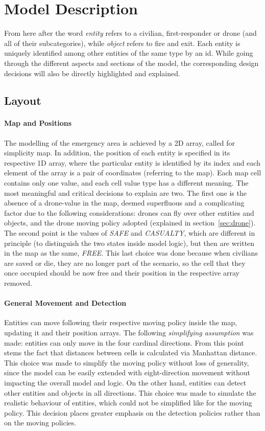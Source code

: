 
\section{Model Description}
From here after the word \textit{entity} refers to a civilian, first-responder or drone (and all of their subcategories), while \textit{object} refers to fire and exit. Each entity is uniquely identified among other entities of the same type by an id. While going through the different aspects and sections of the model, the corresponding design decisions will also be directly highlighted and explained.


\subsection{Layout}
\paragraph{Map and Positions}
\label{sec:map}
The modelling of the emergency area is achieved by a 2D array, called for simplicity map. In addition, the position of each entity is specified in its respective 1D array, where the particular entity is identified by its index and each element of the array is a pair of coordinates (referring to the map).\newline
Each map cell contains only one value, and each cell value type has a different meaning. The most meaningful and critical decisions to explain are two. The first one is the absence of a drone-value in the map, deemed superfluous and a complicating factor due to the following considerations: drones can fly over other entities and objects, and the drone moving policy adopted (explained in section~\ref{sec:drone}). The second point is the values of \textit{SAFE} and \textit{CASUALTY}, which are different in principle (to distinguish the two states inside model logic), but then are written in the map as the same, \textit{FREE}. This last choice was done because when civilians are saved or die, they are no longer part of the scenario, so the cell that they once occupied should be now free and their position in the respective array removed.
\paragraph{General Movement and Detection}
Entities can move following their respective moving policy inside the map, updating it and their position arrays. The following \textit{simplifying assumption} was made: entities can only move in the four cardinal directions. From this point stems the fact that distances between cells is calculated via Manhattan distance. This choice was made to simplify the moving policy without loss of generality, since the model can be easily extended with eight-direction movement without impacting the overall model and logic. On the other hand, entities can detect other entities and objects in all directions. This choice was made to simulate the realistic behaviour of entities, which could not be simplified like for the moving policy. This decision places greater emphasis on the detection policies rather than on the moving policies.


